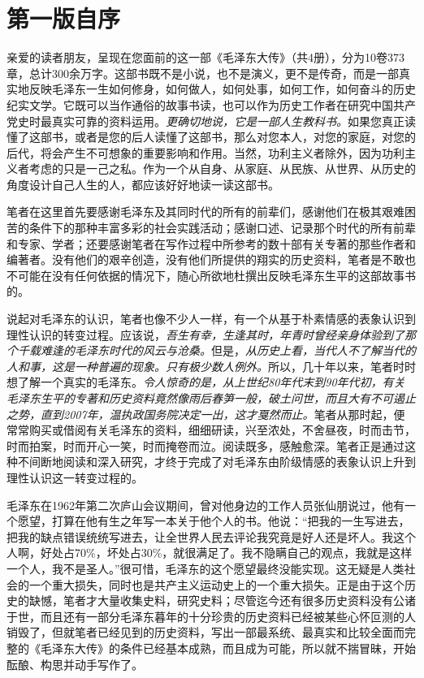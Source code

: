 \documentclass[../../dazhuan.tex]{subfiles}
\begin{document}
\clearpage
\chapter*{第一版自序}


亲爱的读者朋友，呈现在您面前的这一部《毛泽东大传》（共4册），分为10卷373章，总计300余万字。这部书既不是小说，也不是演义，更不是传奇，而是一部真实地反映毛泽东一生如何修身，如何做人，如何处事，如何工作，如何奋斗的历史纪实文学。它既可以当作通俗的故事书读，也可以作为历史工作者在研究中国共产党史时最真实可靠的资料运用。\emph{更确切地说，它是一部人生教科书。}如果您真正读懂了这部书，或者是您的后人读懂了这部书，那么对您本人，对您的家庭，对您的后代，将会产生不可想象的重要影响和作用。当然，功利主义者除外，因为功利主义者考虑的只是一己之私。作为一个从自身、从家庭、从民族、从世界、从历史的角度设计自己人生的人，都应该好好地读一读这部书。

笔者在这里首先要感谢毛泽东及其同时代的所有的前辈们，感谢他们在极其艰难困苦的条件下的那种丰富多彩的社会实践活动；感谢口述、记录那个时代的所有前辈和专家、学者；还要感谢笔者在写作过程中所参考的数十部有关专著的那些作者和编著者。没有他们的艰辛创造，没有他们所提供的翔实的历史资料，笔者是不敢也不可能在没有任何依据的情况下，随心所欲地杜撰出反映毛泽东生平的这部故事书的。

说起对毛泽东的认识，笔者也像不少人一样，有一个从基于朴素情感的表象认识到理性认识的转变过程。应该说，\emph{吾生有幸，生逢其时，年青时曾经亲身体验到了那个千载难逢的毛泽东时代的风云与沧桑。}但是，\emph{从历史上看，当代人不了解当代的人和事，这是一种普遍的现象。只有极少数人例外。}所以，几十年以来，笔者时时想了解一个真实的毛泽东。\emph{令人惊奇的是，从上世纪80年代末到90年代初，有关毛泽东生平的专著和历史资料竟然像雨后春笋一般，破土问世，而且大有不可遏止之势，直到2007年，温执政国务院决定一出，这才戛然而止。}笔者从那时起，便常常购买或借阅有关毛泽东的资料，细细研读，兴至浓处，不舍昼夜，时而击节，时而拍案，时而开心一笑，时而掩卷而泣。阅读既多，感触愈深。笔者正是通过这种不间断地阅读和深入研究，才终于完成了对毛泽东由阶级情感的表象认识上升到理性认识这一转变过程的。

毛泽东在1962年第二次庐山会议期间，曾对他身边的工作人员张仙朋说过，他有一个愿望，打算在他有生之年写一本关于他个人的书。他说：“把我的一生写进去，把我的缺点错误统统写进去，让全世界人民去评论我究竟是好人还是坏人。我这个人啊，好处占70\%，坏处占30\%，就很满足了。我不隐瞒自己的观点，我就是这样一个人，我不是圣人。”很可惜，毛泽东的这个愿望最终没能实现。这无疑是人类社会的一个重大损失，同时也是共产主义运动史上的一个重大损失。正是由于这个历史的缺憾，笔者才大量收集史料，研究史料；尽管迄今还有很多历史资料没有公诸于世，而且还有一部分毛泽东暮年的十分珍贵的历史资料已经被某些心怀叵测的人销毁了，但就笔者已经见到的历史资料，写出一部最系统、最真实和比较全面而完整的《毛泽东大传》的条件已经基本成熟，而且成为可能，所以就不揣冒昧，开始酝酿、构思并动手写作了。 
 
\end{document}

